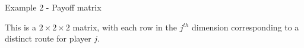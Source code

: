 \begin{example}
\begin{table}[!htbp]
    
    \caption{Example 2 - Payoff matrix}
    \label{tab:prog_output1}
\end{table}


\vspace{5mm}

This is a $2 \times 2 \times 2$ matrix, with each row in the $j^{th}$ dimension corresponding to a distinct route for player $j$.
\end{example}








